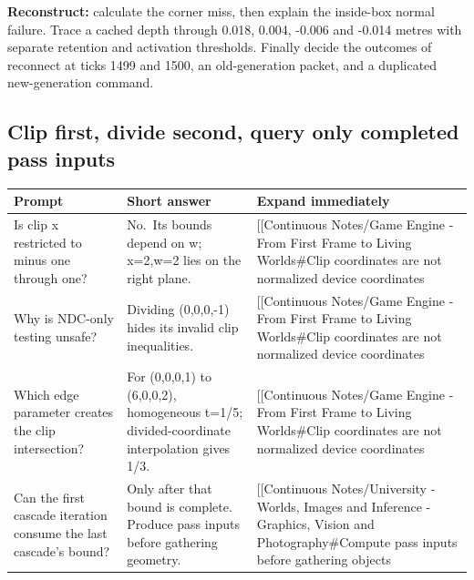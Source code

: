 \textbf{Reconstruct:} calculate the corner miss, then explain the inside-box normal failure. Trace a cached depth through 0.018, 0.004, -0.006 and -0.014 metres with separate retention and activation thresholds. Finally decide the outcomes of reconnect at ticks 1499 and 1500, an old-generation packet, and a duplicated new-generation command.

\subsection{Clip first, divide second, query only completed pass inputs}\label{appendix-64ea716dcadc-clip-first-divide-second-query-only-completed-pass-inputs}

{\def\LTcaptype{none} %
\begin{longtable}[]{@{}
  >{\raggedright\arraybackslash}p{}
  >{\raggedright\arraybackslash}p{}
  >{\raggedright\arraybackslash}p{}@{}}
\toprule\noalign{}
\begin{minipage}[b]{\linewidth}\raggedright
Prompt
\end{minipage} & \begin{minipage}[b]{\linewidth}\raggedright
Short answer
\end{minipage} & \begin{minipage}[b]{\linewidth}\raggedright
Expand immediately
\end{minipage} \\
\midrule\noalign{}
\endhead
\bottomrule\noalign{}
\endlastfoot
Is clip x restricted to minus one through one? & No.~Its bounds depend on w; x=2,w=2 lies on the right plane. & {[}{[}Continuous Notes/Game Engine - From First Frame to Living Worlds\#Clip coordinates are not normalized device coordinates \\
Why is NDC-only testing unsafe? & Dividing (0,0,0,-1) hides its invalid clip inequalities. & {[}{[}Continuous Notes/Game Engine - From First Frame to Living Worlds\#Clip coordinates are not normalized device coordinates \\
Which edge parameter creates the clip intersection? & For (0,0,0,1) to (6,0,0,2), homogeneous t=1/5; divided-coordinate interpolation gives 1/3. & {[}{[}Continuous Notes/Game Engine - From First Frame to Living Worlds\#Clip coordinates are not normalized device coordinates \\
Can the first cascade iteration consume the last cascade's bound? & Only after that bound is complete. Produce pass inputs before gathering geometry. & {[}{[}Continuous Notes/University - Worlds, Images and Inference - Graphics, Vision and Photography\#Compute pass inputs before gathering objects \\
\end{longtable}
}

